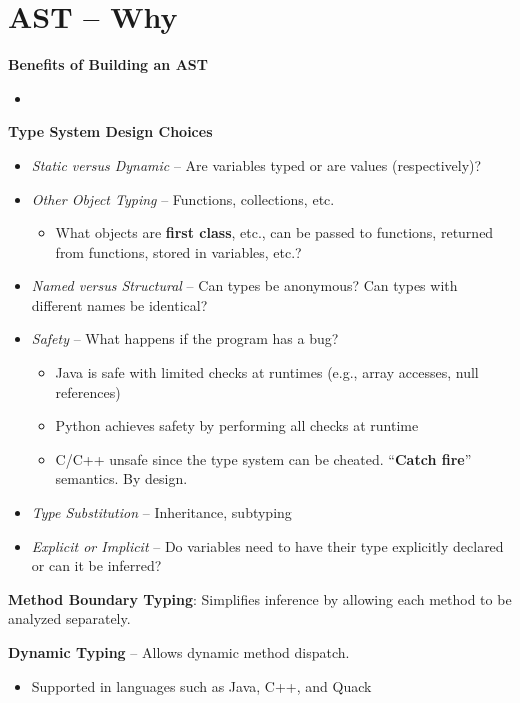 \documentclass[10pt,twocolumn]{report}
\begin{document}
\section{AST -- Why}

  \textbf{Benefits of Building an AST}
  \begin{itemize}
    \item 
  \end{itemize}

  \textbf{Type System Design Choices}
  \begin{itemize}
    \item \textit{Static versus Dynamic} -- Are variables typed or are values (respectively)?
    \item \textit{Other Object Typing} -- Functions, collections, etc. 
    \begin{itemize}
      \item What objects are \textbf{first class}, etc., can be passed to functions, returned from functions, stored in variables, etc.?
    \end{itemize}
    \item \textit{Named versus Structural} -- Can types be anonymous? Can types with different names be identical?
    \item \textit{Safety} -- What happens if the program has a bug?
    \begin{itemize}
      \item Java is safe with limited checks at runtimes (e.g., array accesses, null references)
      \item Python achieves safety by performing all checks at runtime
      \item C/C++ unsafe since the type system can be cheated. ``\textbf{Catch fire}'' semantics. By design.
    \end{itemize}
    
    \item \textit{Type Substitution} -- Inheritance, subtyping
    \item \textit{Explicit or Implicit} -- Do variables need to have their type explicitly declared or can it be inferred?
  \end{itemize}

  \textbf{Method Boundary Typing}: Simplifies inference by allowing each method to be analyzed separately.

  \textbf{Dynamic Typing} -- Allows dynamic method dispatch.
  \begin{itemize}
    \item Supported in languages such as Java, C++, and Quack
  \end{itemize}
\end{document}
